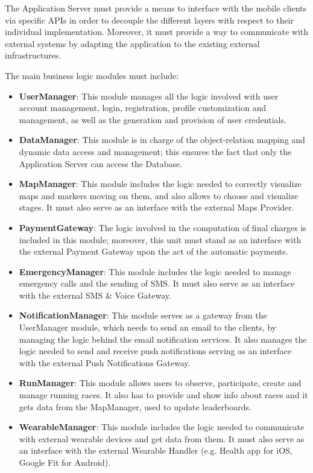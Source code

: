 The Application Server must provide a means to interface with the mobile clients via specific APIs in order to decouple the different layers with respect to their individual implementation. Moreover, it must provide a way to communicate with external systems by adapting the application to the existing external infrastructures. \newline

The main business logic modules must include:
\begin{itemize}
\item \textbf{UserManager}: This module manages all the logic involved with user account management, login, registration, profile customization and management, as well as the generation and provision of user credentials.

\item \textbf{DataManager}: This module is in charge of the object-relation mapping and dynamic data access and management; this ensures the fact that only the Application Server can access the Database.

\item \textbf{MapManager}: This module includes the logic needed to correctly visualize maps and markers moving on them, and also allows to choose and visualize stages. It must also serve as an interface with the external Maps Provider.

\item \textbf{PaymentGateway}: The logic involved in the computation of final charges is included in this module; moreover, this unit must stand as an interface with the external Payment Gateway upon the act of the automatic payments.

\item \textbf{EmergencyManager}: This module includes the logic needed to manage emergency calls and the sending of SMS. It must also serve as an interface with the external SMS \& Voice Gateway.

\item \textbf{NotificationManager}: This module serves as a gateway from the UserManager module, which needs to send an email to the clients, by managing the logic behind the email notification services. It also manages the logic needed to send and receive push notifications serving as an interface with the external Push Notifications Gateway.

\item \textbf{RunManager}: This module allows users to observe, participate, create and manage running races. It also has to provide and show info about races and it gets data from the MapManager, used to update leaderboards.

\item \textbf{WearableManager}: This module includes the logic needed to communicate with external wearable devices and get data from them. It must also serve as an interface with the external Wearable Handler (e.g. Health app for iOS, Google Fit for Android).
\end{itemize}
%